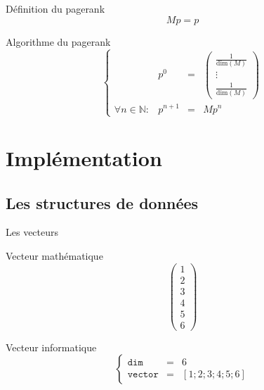 \documentclass{beamer}
\begin{document}
    \begin{frame}
      \begin{alertblock}{Définition du pagerank}
        \bigskip
        $$ Mp = p $$
        \medskip
      \end{alertblock}
      
      \begin{alertblock}{Algorithme du pagerank}
        \bigskip
        $$
          \left\{
            \begin{array}{llcl}
              & p^0 & = & \begin{pmatrix}
                \frac{1}{\text{dim}(M)} \\
                \vdots \\
                \frac{1}{\text{dim}(M)}
              \end{pmatrix}\\
            \forall n \in \mathds{N} : & p^{n+1} & = & M p^n 
            \end{array}
          \right.
        $$
        \medskip
      \end{alertblock}
    \end{frame}
  
  \section{Implémentation}
  
  \subsection{Les structures de données}
  
  \begin{frame}{Les vecteurs}
    \begin{minipage}[c]{.30\linewidth}
      \begin{exampleblock}{Vecteur mathématique}
        \bigskip
        $$
        \begin{pmatrix}
          1 \\
          2 \\
          3 \\
          4 \\
          5 \\
          6
        \end{pmatrix}
        $$
        \bigskip
      \end{exampleblock}
    \end{minipage} \hfill
    \begin{minipage}[c]{.60\linewidth}
      \begin{exampleblock}{Vecteur informatique}
        \vspace{1.3cm}
        $$
        \left\{
          \begin{array}{lcl}
            \texttt{dim} & = & 6 \\
            \texttt{vector} & = & [1;2;3;4;5;6]
          \end{array}
        \right.
        $$
        \vspace{1.3cm}
      \end{exampleblock}
    \end{minipage}
  \end{frame}
  
\end{document}
